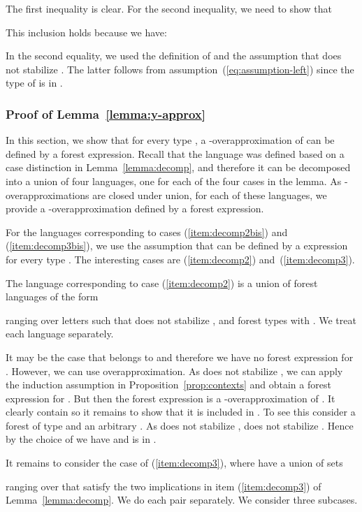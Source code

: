 \documentclass{LMCS}
\begin{document}
The first inequality is clear. For the second inequality, we need to
show that 

This inclusion holds because we have:

In the second equality, we used the definition of  and the
assumption that  does not stabilize . The latter
follows from assumption~(\ref{eq:assumption-left}) since the type of
 is in .

\subsubsection{Proof of Lemma~\ref{lemma:y-approx}}
\label{sec:proof-lemma-y}
In this section, we show that for every type ,
a -overapproximation of  can be defined by a  forest
expression. Recall that the language  was defined based on a case
distinction in Lemma~\ref{lemma:decomp}, and therefore it can be decomposed into a union of four languages, one for each of the four cases in the lemma.  As
-overapproximations are closed under union, for each of these
languages, we provide a -overapproximation defined by a 
forest expression.



For the languages corresponding to cases (\ref{item:decomp2bis}) and (\ref{item:decomp3bis}), we use the assumption that  can be defined by a  expression for every type . The interesting cases are (\ref{item:decomp2}) and~(\ref{item:decomp3}).


The language corresponding to  case (\ref{item:decomp2}) is a union of forest languages of the form

ranging over letters  such that   does not stabilize
   ,  and forest types  with . We treat each language  separately.

It may be the case that  belongs to  and therefore we
have no  forest expression for . However, we can
use overapproximation.  As  does not stabilize , we can apply
the induction assumption in Proposition~\ref{prop:contexts} and obtain
a  forest expression for .  But then the
 forest expression   is
a -overapproximation of . It clearly contain  so
it remains to show that it is included in . To see this consider a forest  of type  and an arbitrary . As  does not stabilize
,  does not stabilize . Hence by the choice of  we have
 and  is in .






It remains to consider the case of  (\ref{item:decomp3}),
where have a union of sets

ranging over  that satisfy the two implications in item (\ref{item:decomp3}) of  Lemma~\ref{lemma:decomp}. We do each pair  separately. 
We consider three subcases.
\end{document}
